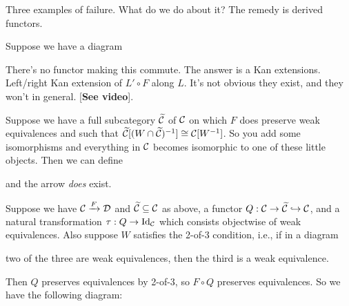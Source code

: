 \documentclass[../MH_Total.tex]{subfiles}
\begin{document}
Three examples of failure. What do we do about it? The remedy is derived functors.

Suppose we have a diagram
\begin{center}
\end{center}
There's no functor making this commute. The answer is a Kan extensions. Left/right Kan extension of $L' \circ F$ along $L$. It's not obvious they exist, and they won't in general. [\textbf{See video}]. 

Suppose we have a full subcategory $\widetilde{\mathcal{C}}$ of $\mathcal{C}$ on which $F$ does preserve weak equivalences and such that $\widetilde{\mathcal{C}}[(W \cap \widetilde{\mathcal{C}})^{-1}] \cong \mathcal{C}[W^{-1}]$. So you add some isomorphisms and everything in $\mathcal{C}$ becomes isomorphic to one of these little objects. Then we can define
\begin{center}
\end{center}
and the arrow \emph{does} exist. 

\begin{theorem}
	Suppose we have $\mathcal{C} \xrightarrow{F} \mathcal{D}$ and $\widetilde{\mathcal{C}} \subseteq \mathcal{C}$ as above, a functor $Q: \mathcal{C} \to \widetilde{\mathcal{C}} \hookrightarrow \mathcal{C}$, and a natural transformation $\tau: Q \to \operatorname{Id}_{\mathcal{C}}$ which consists objectwise of weak equivalences.
	Also suppose $W$ satisfies the 2-of-3 condition, i.e., if in a diagram
	\begin{center}
	\end{center}
	two of the three are weak equivalences, then the third is a weak equivalence.

	Then $Q$ preserves equivalences by 2-of-3, so $F \circ Q$ preserves equivalences. So we have the following diagram:
	\begin{center}
	\end{center}
\end{theorem}
\end{document}
